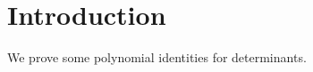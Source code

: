 \documentclass{amsart}
\begin{document}
\section{Introduction}
{
    We prove some polynomial identities for determinants. 
}
\end{document}
